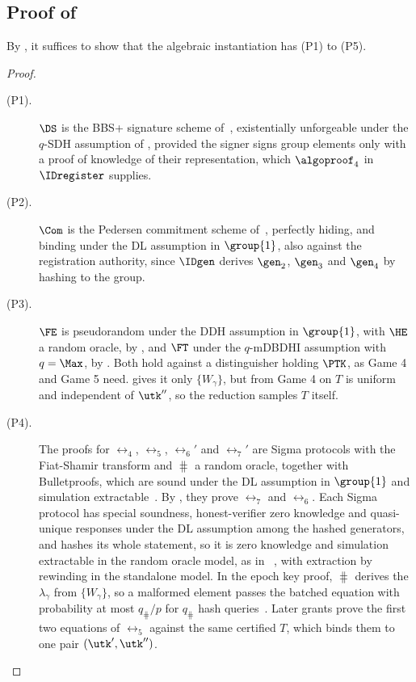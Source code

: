 \subsection{Proof of }\label{sec:txid-inst-sec}

By , it suffices to show that the algebraic instantiation
has (P1) to (P5).

\begin{proof}

\begin{description}

  \item[(P1).] $\DS$ is the BBS+ signature scheme of~, existentially unforgeable
under the $q$-SDH assumption of , provided the signer signs
group elements only with a proof of knowledge of their representation, which
$\algoproof_4$ in $\IDregister$ supplies.

  \item[(P2).] $\Com$ is the Pedersen commitment scheme of~,
perfectly hiding, and binding under the DL assumption in $\group{1}$, also
against the registration authority, since $\IDgen$ derives $\gen_2$, $\gen_3$
and $\gen_4$ by hashing to the group.

  \item[(P3).] $\FE$ is pseudorandom under the DDH assumption in $\group{1}$,
with $\HE$ a random oracle, by , and $\FT$ under the
$q$-mDBDHI assumption with $q = \Max$, by . Both hold
against a distinguisher holding $\PTK$, as Game 4 and Game 5 need.
 gives it only $\{W_\gamma\}$, but from Game 4 on $T$ is
uniform and independent of $\utk''$, so the reduction samples $T$ itself.

  \item[(P4).] The proofs for $\rel_4$, $\rel_5$, $\rel_6'$ and $\rel_7'$ are
Sigma protocols with the Fiat-Shamir transform and $\hash$ a random oracle,
together with Bulletproofs, which are sound under the DL assumption in
$\group{1}$ and simulation extractable~\cite{SP:BBBPWM18,EC:DaoGru23}. By
, they prove $\rel_7$ and $\rel_6$. Each
Sigma protocol has special soundness, honest-verifier zero knowledge and
quasi-unique responses under the DL assumption among the hashed generators, and
hashes its whole statement, so it is zero knowledge and simulation extractable
in the random oracle model, as in ~\cite{INDOCRYPT:FKMV12},
with extraction by rewinding in the standalone model. In the epoch key proof,
$\hash$ derives the $\lambda_\gamma$ from $\{W_\gamma\}$, so a malformed element
passes the batched equation with probability at most $q_{\hash}/p$ for
$q_{\hash}$ hash queries~\cite{EC:BelGarRab98}. Later grants prove the first
two equations of $\rel_5$ against the same certified $T$, which binds them to
one pair $(\utk',\utk'')$.


\end{description}
\end{proof}
